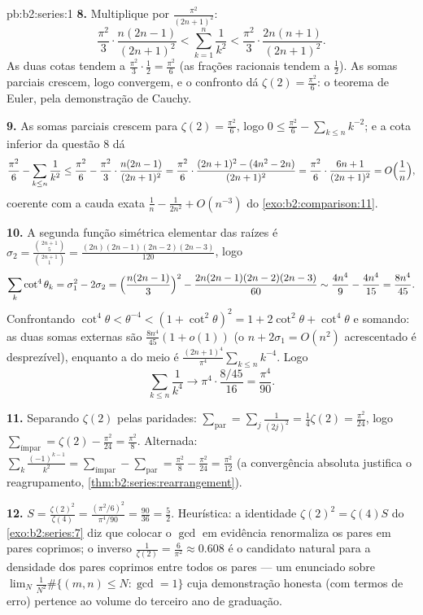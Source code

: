 \begin{solution}{pb:b2:series:1}
\textbf{8.} Multiplique por $\frac{\pi^2}{(2n+1)^2}$:
\[
\frac{\pi^2}{3}\cdot\frac{n(2n-1)}{(2n+1)^2}
< \sum_{k=1}^{n}\frac1{k^2} <
\frac{\pi^2}{3}\cdot\frac{2n(n+1)}{(2n+1)^2}.
\]
As duas cotas tendem a $\frac{\pi^2}3\cdot\frac12 = \frac{\pi^2}6$
(as frações racionais tendem a $\frac12$). As somas parciais
crescem, logo convergem, e o confronto dá $\zeta(2) =
\frac{\pi^2}6$: o teorema de Euler, pela demonstração de Cauchy.

\textbf{9.} As somas parciais crescem para $\zeta(2) =
\frac{\pi^2}6$, logo $0 \leq \frac{\pi^2}6 - \sum_{k\leq n}k^{-2}$;
e a cota inferior da questão 8 dá
\[
\frac{\pi^2}6 - \sum_{k\leq n}\frac1{k^2}
\leq \frac{\pi^2}6 - \frac{\pi^2}3\cdot\frac{n(2n-1)}{(2n+1)^2}
= \frac{\pi^2}6\cdot\frac{(2n+1)^2 - (4n^2 -
2n)}{(2n+1)^2}
= \frac{\pi^2}6\cdot\frac{6n + 1}{(2n+1)^2}
= O\Bigl(\frac1n\Bigr),
\]
coerente com a cauda exata $\frac1n - \frac1{2n^2} + O(n^{-3})$ do
\cref{exo:b2:comparison:11}.

\textbf{10.} A segunda função simétrica elementar das
raízes é $\sigma_2 = \frac{\binom{2n+1}5}{\binom{2n+1}1} =
\frac{(2n)(2n-1)(2n-2)(2n-3)}{120}$, logo
\[
\sum_k\cot^4\theta_k = \sigma_1^2 - 2\sigma_2
= \Bigl(\frac{n(2n-1)}3\Bigr)^2 -
\frac{2n(2n-1)(2n-2)(2n-3)}{60}
\sim \frac{4n^4}9 - \frac{4n^4}{15} = \frac{8n^4}{45}.
\]
Confrontando $\cot^4\theta < \theta^{-4} < (1 + \cot^2\theta)^2 =
1 + 2\cot^2\theta + \cot^4\theta$ e somando: as duas somas externas
são $\frac{8n^4}{45}(1 + o(1))$ (o $n + 2\sigma_1 =
O(n^2)$ acrescentado é desprezível), enquanto a do meio é
$\frac{(2n+1)^4}{\pi^4}\sum_{k\leq n}k^{-4}$. Logo
\[
\sum_{k\leq n}\frac1{k^4} \longrightarrow
\pi^4\cdot\frac{8/45}{16} = \frac{\pi^4}{90}.
\]

\textbf{11.} Separando $\zeta(2)$ pelas paridades: $\sum_{\text{par}}
= \sum_j\frac{1}{(2j)^2} = \frac14\zeta(2) = \frac{\pi^2}{24}$,
logo $\sum_{\text{ímpar}} = \zeta(2) - \frac{\pi^2}{24} =
\frac{\pi^2}8$. Alternada: $\sum_k\frac{(-1)^{k-1}}{k^2} =
\sum_{\text{ímpar}} - \sum_{\text{par}} = \frac{\pi^2}8 -
\frac{\pi^2}{24} = \frac{\pi^2}{12}$ (a convergência absoluta
justifica o reagrupamento,
\cref{thm:b2:series:rearrangement}).

\textbf{12.} $S = \frac{\zeta(2)^2}{\zeta(4)} =
\frac{(\pi^2/6)^2}{\pi^4/90} = \frac{90}{36} = \frac52$.
Heurística: a identidade $\zeta(2)^2 = \zeta(4)S$ do
\cref{exo:b2:series:7} diz que colocar o $\gcd$ em evidência
renormaliza os pares em pares coprimos; o inverso
$\frac1{\zeta(2)} = \frac6{\pi^2} \approx 0.608$ é o candidato natural
para a densidade dos pares coprimos entre todos os pares ---
um enunciado sobre $\lim_N \frac{1}{N^2}\#\{(m,n) \leq N :
\gcd = 1\}$ cuja demonstração honesta (com termos de erro) pertence
ao volume do terceiro ano de graduação.


\end{solution}
